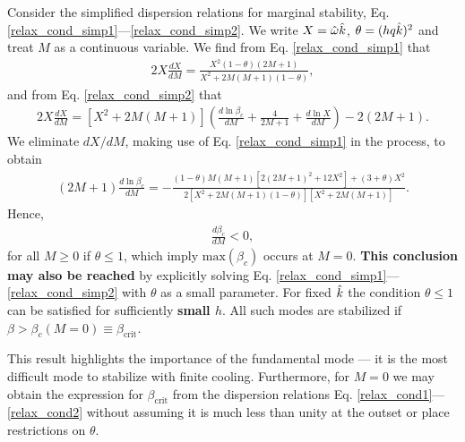 Consider the simplified dispersion relations for marginal stability,
Eq. \ref{relax_cond_simp1}---\ref{relax_cond_simp2}. We write 
$X= \hat{\omega}\hat{k}$, $\theta = (hq\hat{k})^2$ and  
treat $M$ as a continuous variable. We find from
Eq. \ref{relax_cond_simp1} that  
\begin{align}
  2 X \frac{d X}{dM} = \frac{X^2(1-\theta)(2M+1)}{X^2 +
  2M(M+1)(1-\theta)}, 
\end{align}
and from Eq. \ref{relax_cond_simp2} that
\begin{align}
  2X\frac{dX}{dM} = \left[X^2 +
  2M(M+1)\right]\left(\frac{d\ln{\beta_c}}{dM} + \frac{4}{2M+1} +
  \frac{d\ln{X}}{dM}\right) - 2(2M+1). 
\end{align}
We eliminate $dX/dM$, making use of Eq. \ref{relax_cond_simp1} in the process, to obtain 
\begin{align}
  (2M+1)\frac{d\ln{\beta_c}}{dM} %
  = -\frac{(1-\theta)M(M+1)\left[ 2(2M+1)^2 + 12X^2\right]
  + (3+\theta)X^2}{2 \left[X^2 +
  2M(M+1)(1-\theta)\right]\left[X^2 + 2M(M+1)\right]}.  
\end{align}
Hence,
\begin{align}\label{dbeta_dm}
  \frac{d\beta_c}{dM}<0, 
\end{align}
for all $M\geq 0$ if $\theta\leq 1$, which imply 
$\mathrm{max}(\beta_c)$ occurs at $M=0$.  {\bf This conclusion may also be reached} by explicitly solving 
Eq. \ref{relax_cond_simp1}---\ref{relax_cond_simp2} with $\theta$ as a small parameter. 
For fixed $\hat{k}$ the condition $\theta\leq 1$ can be satisfied for 
sufficiently {\bf small $h$}. All such modes are stabilized if
$\beta>\beta_c(M=0)\equiv\beta_\mathrm{crit}$. 

This result highlights the importance of the fundamental mode  
--- it is the most difficult mode to stabilize with finite
cooling. Furthermore, for $M=0$ we may obtain the expression  
for $\beta_\mathrm{crit}$ from the dispersion relations 
Eq. \ref{relax_cond1}---\ref{relax_cond2} without  
assuming it is much less than unity at the outset or place
restrictions on $\theta$.  
 
